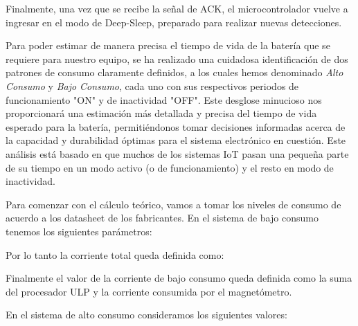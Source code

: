 Finalmente, una vez que se recibe la señal de ACK, el microcontrolador vuelve a ingresar en el modo de Deep-Sleep, preparado para realizar nuevas detecciones.

Para poder estimar de manera precisa el tiempo de vida de la batería que se requiere para nuestro equipo, se ha realizado una cuidadosa identificación de dos patrones de consumo claramente definidos, a los cuales hemos denominado \textit{Alto Consumo} y \textit{Bajo Consumo}, cada uno con sus respectivos periodos de funcionamiento "ON" y de inactividad "OFF". Este desglose minucioso nos proporcionará una estimación más detallada y precisa del tiempo de vida esperado para la batería, permitiéndonos tomar decisiones informadas acerca de la capacidad y durabilidad óptimas para el sistema electrónico en cuestión. Este análisis está basado en que muchos de los sistemas IoT pasan una pequeña parte de su tiempo en un modo activo (o de funcionamiento) y el resto en modo de inactividad.

Para comenzar con el cálculo teórico, vamos a tomar los niveles de consumo de acuerdo a los datasheet de los fabricantes. En el sistema de bajo consumo tenemos los siguientes parámetros:


Por lo tanto la corriente total queda definida como:


Finalmente el valor de la corriente de bajo consumo queda definida como la suma del procesador ULP y la corriente consumida por el magnetómetro.


En el sistema de alto consumo consideramos los siguientes valores:

